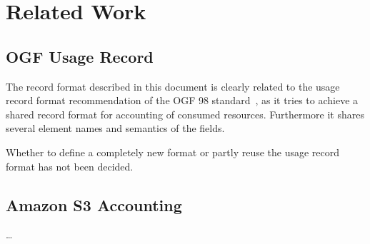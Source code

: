 \section{Related Work}


\subsection{OGF Usage Record}

The record format described in this document is clearly related to the usage
record format recommendation of the OGF 98 standard~\cite{ogf98ur}, as it tries
to achieve a shared record format for accounting of consumed resources.
Furthermore it shares several element names and semantics of the fields.

Whether to define a completely new format or partly reuse the usage record
format has not been decided.


\subsection{Amazon S3 Accounting}

\ldots

